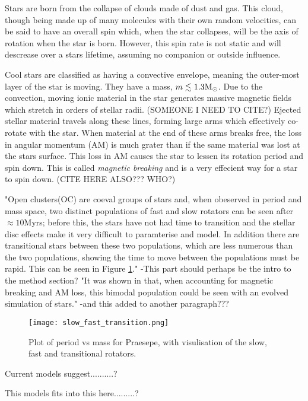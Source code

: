 \documentclass[fleqn,usenatbib]{mnras}
\begin{document}
Stars are born from the collapse of clouds made of dust and gas.
This cloud, though being made up of many molecules with their own random velocities, can be said to have an overall spin which, when the star collapses, will be the axis of rotation when the star is born.
However, this spin rate is not static and will descrease over a stars lifetime, assuming no companion or outside influence.

Cool stars are classified as having a convective envelope, meaning the outer-most layer of the star is moving.
They have a mass, $m \lesssim 1.3 \textup{M}_\odot$. 
Due to the convection, moving ionic material in the star generates massive magnetic fields which stretch in orders of stellar radii. (SOMEONE I NEED TO CITE?)
Ejected stellar material travels along these lines, forming large arms which effectively co-rotate with the star.
When material at the end of these arms breaks free, the loss in angular momentum (AM) is much grater than if the same material was lost at the stars surface.
This loss in AM causes the star to lessen its rotation period and spin down.
This is called \textit{magnetic breaking} and is a very effecient way for a star to spin down. (CITE HERE ALSO??? WHO?)

"Open clusters(OC) are coeval groups of stars and, when obeserved in period and mass space, two distinct populations of fast and slow rotators can be seen after $\approx 10$Myrs; before this, the stars have not had time to transition and the  stellar disc effects make it very difficult to paramterise and model.
In addition there are  transitional stars between these two populations, which are less numerous than the two populations, showing the time to move between the populations must be rapid.
This can be seen in Figure \ref{fig:slow_fast_transition}."
-This part should perhaps be the intro to the method section?
"It was shown in \cite{Garraffo_2018} that, when accounting for magnetic breaking and AM loss, this bimodal population could be seen with an evolved simulation of stars."
-and this added to another paragraph???

\begin{figure}
	\texttt{[image: slow\_fast\_transition.png]}
	\caption[]{Plot of period vs mass for Praesepe, with visulisation of the slow, fast and transitional rotators.}
	\label{fig:slow_fast_transition}
\end{figure}

Current models suggest..........?

This models fits into this here.........?
\end{document}
